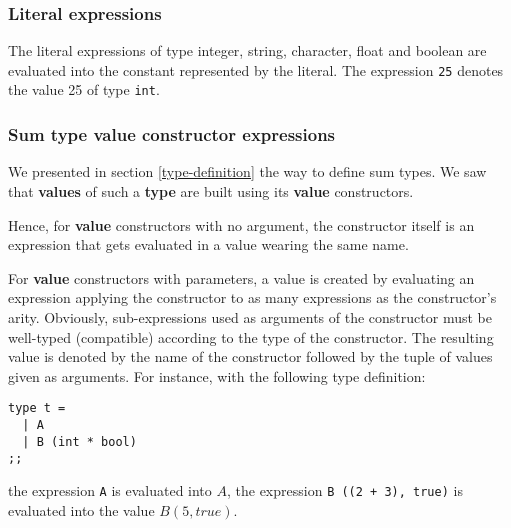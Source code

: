 \vspace{0.2cm}



\subsubsection{Literal expressions}
 

The literal
expressions  of type integer, string, character,
float and boolean are evaluated into the constant represented by the
literal. The expression {\tt 25} denotes the value 25 of type
{\tt int}.



\subsubsection{Sum type  value constructor expressions}
We presented in section \ref{type-definition} the way to define sum
types. We saw that {\bf values} of such a {\bf type} are built using
its {\bf value} constructors.

Hence, for {\bf value} constructors with no argument, the constructor itself
is an expression that gets evaluated in a value wearing the same name.

For {\bf value} constructors with parameters, a value is created by
evaluating an expression applying the constructor to as many expressions as
the constructor's arity. Obviously, sub-expressions used as arguments of
the constructor must be well-typed (compatible) according to the type of the %
constructor. The resulting value is denoted by the
name of the constructor followed by the tuple of values given as
arguments. For instance, with the following type definition:
{\scriptsize
\begin{lstlisting}
type t =
  | A
  | B (int * bool)
;;
\end{lstlisting}
}
the expression {\tt A} is evaluated into $A$, the expression
{\tt B ((2 + 3), true)} is evaluated into the value $B (5, true)$.



